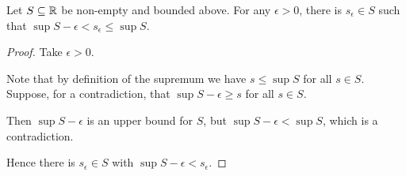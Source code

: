 \begin{proposition}
Let $S \subseteq \mathbb R$ be non-empty and bounded above. For any $\epsilon > 0$, there is $s_\epsilon \in S$ such that $\sup S-\epsilon < s_\epsilon \le \sup S$.
\end{proposition}
\begin{proof}
Take $\epsilon > 0$.

Note that by definition of the supremum we have $s \le \sup S$ for all $s \in S$. Suppose, for a contradiction, that $\sup S-\epsilon \ge s$ for all $s \in S$.

Then $\sup S-\epsilon$ is an upper bound for $S$, but $\sup S-\epsilon < \sup S$, which is a contradiction.

Hence there is $s_\epsilon \in S$ with $\sup S-\epsilon<s_\epsilon$.
\end{proof}


